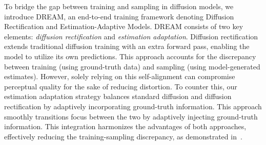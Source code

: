 \documentclass[10pt,twocolumn,letterpaper]{article}
\begin{document}
To bridge the gap between training and sampling in diffusion models, we introduce DREAM, an end-to-end training framework denoting Diffusion Rectification and Estimation-Adaptive Models. DREAM consists of two key elements: \emph{diffusion rectification} and \emph{estimation adaptation}. Diffusion rectification extends traditional diffusion training with an extra forward pass, enabling the model to utilize its own predictions. This approach accounts for the discrepancy between training (using ground-truth data) and sampling (using model-generated estimates). However, solely relying on this self-alignment can compromise perceptual quality for the sake of reducing distortion. To counter this, our estimation adaptation strategy balances standard diffusion and diffusion rectification by adaptively incorporating ground-truth information.  This approach smoothly transitions focus between the two by adaptively injecting ground-truth information. This integration harmonizes the advantages of both approaches, effectively reducing the training-sampling discrepancy, as demonstrated in~.
\end{document}
